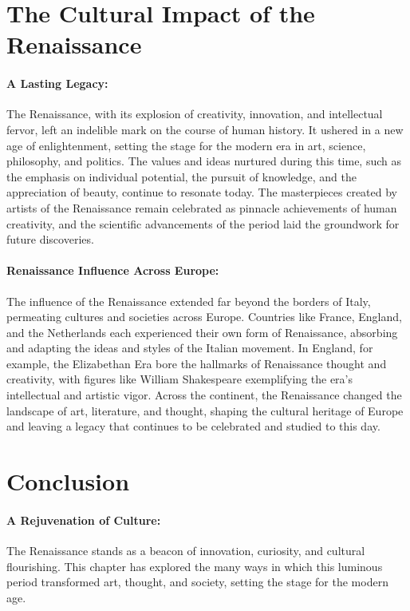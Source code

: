 \documentclass[a4paper,12pt]{book}
\begin{document}
\section*{The Cultural Impact of the Renaissance}

\paragraph{A Lasting Legacy:}
The Renaissance, with its explosion of creativity, innovation, and intellectual fervor, left an indelible mark on the course of human history. It ushered in a new age of enlightenment, setting the stage for the modern era in art, science, philosophy, and politics. The values and ideas nurtured during this time, such as the emphasis on individual potential, the pursuit of knowledge, and the appreciation of beauty, continue to resonate today. The masterpieces created by artists of the Renaissance remain celebrated as pinnacle achievements of human creativity, and the scientific advancements of the period laid the groundwork for future discoveries.

\paragraph{Renaissance Influence Across Europe:}
The influence of the Renaissance extended far beyond the borders of Italy, permeating cultures and societies across Europe. Countries like France, England, and the Netherlands each experienced their own form of Renaissance, absorbing and adapting the ideas and styles of the Italian movement. In England, for example, the Elizabethan Era bore the hallmarks of Renaissance thought and creativity, with figures like William Shakespeare exemplifying the era’s intellectual and artistic vigor. Across the continent, the Renaissance changed the landscape of art, literature, and thought, shaping the cultural heritage of Europe and leaving a legacy that continues to be celebrated and studied to this day.

\section*{Conclusion}

\paragraph{A Rejuvenation of Culture:}
The Renaissance stands as a beacon of innovation, curiosity, and cultural flourishing. This chapter has explored the many ways in which this luminous period transformed art, thought, and society, setting the stage for the modern age.
\end{document}
